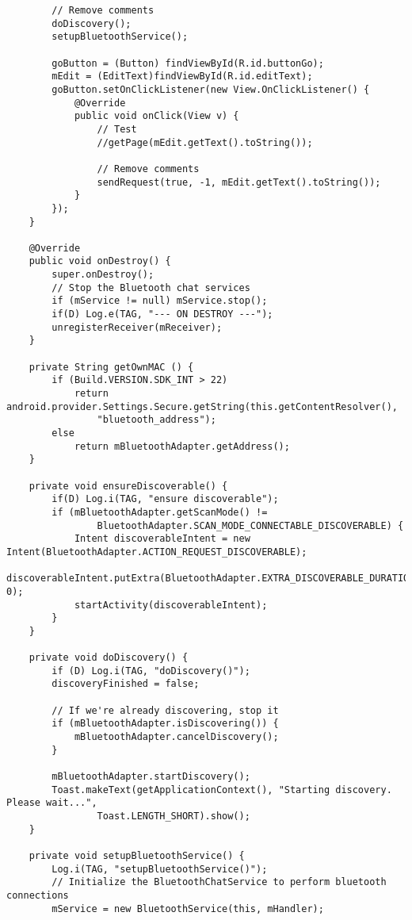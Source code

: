 \begin{verbatim}
        // Remove comments
        doDiscovery();
        setupBluetoothService();

        goButton = (Button) findViewById(R.id.buttonGo);
        mEdit = (EditText)findViewById(R.id.editText);
        goButton.setOnClickListener(new View.OnClickListener() {
            @Override
            public void onClick(View v) {
                // Test
                //getPage(mEdit.getText().toString());

                // Remove comments
                sendRequest(true, -1, mEdit.getText().toString());
            }
        });
    }

    @Override
    public void onDestroy() {
        super.onDestroy();
        // Stop the Bluetooth chat services
        if (mService != null) mService.stop();
        if(D) Log.e(TAG, "--- ON DESTROY ---");
        unregisterReceiver(mReceiver);
    }

    private String getOwnMAC () {
        if (Build.VERSION.SDK_INT > 22)
            return android.provider.Settings.Secure.getString(this.getContentResolver(),
                "bluetooth_address");
        else
            return mBluetoothAdapter.getAddress();
    }

    private void ensureDiscoverable() {
        if(D) Log.i(TAG, "ensure discoverable");
        if (mBluetoothAdapter.getScanMode() !=
                BluetoothAdapter.SCAN_MODE_CONNECTABLE_DISCOVERABLE) {
            Intent discoverableIntent = new Intent(BluetoothAdapter.ACTION_REQUEST_DISCOVERABLE);
            discoverableIntent.putExtra(BluetoothAdapter.EXTRA_DISCOVERABLE_DURATION, 0);
            startActivity(discoverableIntent);
        }
    }

    private void doDiscovery() {
        if (D) Log.i(TAG, "doDiscovery()");
        discoveryFinished = false;

        // If we're already discovering, stop it
        if (mBluetoothAdapter.isDiscovering()) {
            mBluetoothAdapter.cancelDiscovery();
        }

        mBluetoothAdapter.startDiscovery();
        Toast.makeText(getApplicationContext(), "Starting discovery. Please wait...",
                Toast.LENGTH_SHORT).show();
    }

    private void setupBluetoothService() {
        Log.i(TAG, "setupBluetoothService()");
        // Initialize the BluetoothChatService to perform bluetooth connections
        mService = new BluetoothService(this, mHandler);


\end{verbatim}
